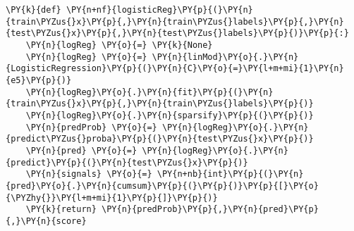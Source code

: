{\par%
\vspace{-1\baselineskip}%
}%
\begin{notebookcell}[]%
\begin{addmargin}[\cellleftmargin]{0em}%
{\smaller%
\par%
%
\vspace{-1\smallerfontscale}%
\begin{Verbatim}[commandchars=\\\{\}]
\PY{k}{def} \PY{n+nf}{logisticReg}\PY{p}{(}\PY{n}{train\PYZus{}x}\PY{p}{,}\PY{n}{train\PYZus{}labels}\PY{p}{,}\PY{n}{test\PYZus{}x}\PY{p}{,}\PY{n}{test\PYZus{}labels}\PY{p}{)}\PY{p}{:}
    \PY{n}{logReg} \PY{o}{=} \PY{k}{None}
    \PY{n}{logReg} \PY{o}{=} \PY{n}{linMod}\PY{o}{.}\PY{n}{LogisticRegression}\PY{p}{(}\PY{n}{C}\PY{o}{=}\PY{l+m+mi}{1}\PY{n}{e5}\PY{p}{)}
    \PY{n}{logReg}\PY{o}{.}\PY{n}{fit}\PY{p}{(}\PY{n}{train\PYZus{}x}\PY{p}{,}\PY{n}{train\PYZus{}labels}\PY{p}{)}
    \PY{n}{logReg}\PY{o}{.}\PY{n}{sparsify}\PY{p}{(}\PY{p}{)}
    \PY{n}{predProb} \PY{o}{=} \PY{n}{logReg}\PY{o}{.}\PY{n}{predict\PYZus{}proba}\PY{p}{(}\PY{n}{test\PYZus{}x}\PY{p}{)}
    \PY{n}{pred} \PY{o}{=} \PY{n}{logReg}\PY{o}{.}\PY{n}{predict}\PY{p}{(}\PY{n}{test\PYZus{}x}\PY{p}{)}
    \PY{n}{signals} \PY{o}{=} \PY{n+nb}{int}\PY{p}{(}\PY{n}{pred}\PY{o}{.}\PY{n}{cumsum}\PY{p}{(}\PY{p}{)}\PY{p}{[}\PY{o}{\PYZhy{}}\PY{l+m+mi}{1}\PY{p}{]}\PY{p}{)}  
    \PY{k}{return} \PY{n}{predProb}\PY{p}{,}\PY{n}{pred}\PY{p}{,}\PY{n}{score}
\end{Verbatim}
%
\par%
\vspace{-1\smallerfontscale}}%
\end{addmargin}
\end{notebookcell}



